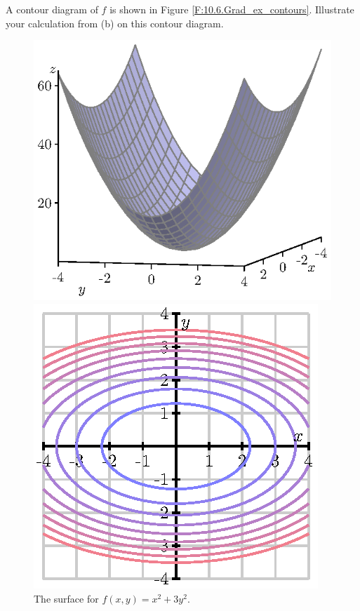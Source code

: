 \begin{exercises}
    \item A contour diagram of $f$ is shown in Figure \ref{F:10.6.Grad_ex_contours}. Illustrate your calculation from (b) on this contour diagram.
\begin{figure}[ht]
\begin{center}
\begin{minipage}{2.5in}
\begin{center}
  \includegraphics{figures/fig_10_6_exercise_graph.eps}
\end{center}
\caption{The surface for $f(x,y) = x^2+3y^2$.}
\label{F:10.6.Grad_ex}
\end{minipage} \hspace{0.5in}
\begin{minipage}{2.5in}
\begin{center}
  \includegraphics{figures/fig_10_6_exercise_contour.eps}

\end{center}
\end{minipage}
\end{center}
\end{figure}
\end{exercises}
